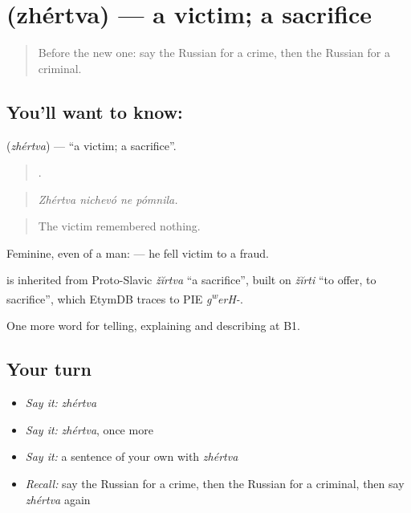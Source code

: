 \section[\texorpdfstring{\ru{жертва} (zhértva)}{жертва (zhértva)}]{ (zhértva) — a victim; a sacrifice}

\label{lesson:RU-C287-zhertva}



\begin{quote}
Before the new one: say the Russian for a crime, then the Russian for a criminal.
\end{quote}

\subsection*{You'll want to know: }
\textbf{} (\emph{zhértva}) — \textquotedblleft{}a victim; a sacrifice\textquotedblright{}.

\begin{quote}
   .
\end{quote}

\begin{quote}
\emph{Zhértva nichevó ne pómnila.}
\end{quote}

\begin{quote}
The victim remembered nothing.
\end{quote}

Feminine, even of a man: \emph{   } — he fell victim to a fraud.

\begin{cousinweb}
\emph{} is inherited from Proto-Slavic \emph{žĭrtva} \textquotedblleft{}a sacrifice\textquotedblright{}, built on \emph{žĭrti} \textquotedblleft{}to offer, to sacrifice\textquotedblright{}, which EtymDB traces to PIE \emph{g\textsuperscript{w}erH-}.
\end{cousinweb}

\begin{grammarlens}[title={What you've built}]
One more word for telling, explaining and describing at B1.
\end{grammarlens}

\subsection*{Your turn}
\begin{itemize}
\raggedright
  \item \emph{Say it:} \emph{zhértva}
  \item \emph{Say it:} \emph{zhértva}, once more
  \item \emph{Say it:} a sentence of your own with \emph{zhértva}
  \item \emph{Recall:} say the Russian for a crime, then the Russian for a criminal, then say \emph{zhértva} again
\end{itemize}

